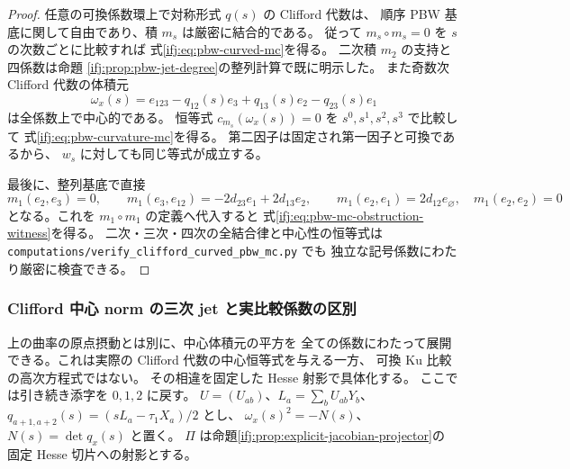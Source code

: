 \begin{proof}
任意の可換係数環上で対称形式 $q(s)$ の Clifford 代数は、
順序 PBW 基底に関して自由であり、積 $m_s$ は厳密に結合的である。
従って $m_s\circ m_s=0$ を $s$ の次数ごとに比較すれば
式\eqref{ifj:eq:pbw-curved-mc}を得る。
二次積 $m_2$ の支持と四係数は命題
\ref{ifj:prop:pbw-jet-degree}の整列計算で既に明示した。
また奇数次 Clifford 代数の体積元
\[
 \omega_x(s)=e_{123}-q_{12}(s)e_3
                       +q_{13}(s)e_2-q_{23}(s)e_1
\]
は全係数上で中心的である。
恒等式 $c_{m_s}(\omega_x(s))=0$ を
$s^0,s^1,s^2,s^3$ で比較して
式\eqref{ifj:eq:pbw-curvature-mc}を得る。
第二因子は固定され第一因子と可換であるから、
$w_s$ に対しても同じ等式が成立する。

最後に、整列基底で直接
\[
 m_1(e_2,e_3)=0,\qquad
 m_1(e_3,e_{12})=-2d_{23}e_1+2d_{13}e_2,
 \qquad m_1(e_2,e_1)=2d_{12}e_\varnothing,
 \quad m_1(e_2,e_2)=0
\]
となる。これを $m_1\circ m_1$ の定義へ代入すると
式\eqref{ifj:eq:pbw-mc-obstruction-witness}を得る。
二次・三次・四次の全結合律と中心性の恒等式は
\texttt{computations/verify\_clifford\_curved\_pbw\_mc.py} でも
独立な記号係数にわたり厳密に検査できる。
\end{proof}




\subsubsection{Clifford 中心 norm の三次 jet と実比較係数の区別}
\label{ifj:subsubsec:central-norm-jets}

上の曲率の原点摂動とは別に、中心体積元の平方を
全ての係数にわたって展開できる。これは実際の
Clifford 代数の中心恒等式を与える一方、
可換 Ku 比較の高次方程式ではない。
その相違を固定した Hesse 射影で具体化する。
ここでは引き続き添字を $0,1,2$ に戻す。
$U=(U_{ab})$、$L_a=\sum_bU_{ab}Y_b$、
$q_{a+1,a+2}(s)=(sL_a-\tau_1X_a)/2$ とし、
$\omega_x(s)^2=-N(s)$、$N(s)=\det q_x(s)$ と置く。
$\Pi$ は命題\ref{ifj:prop:explicit-jacobian-projector}の
固定 Hesse 切片への射影とする。

